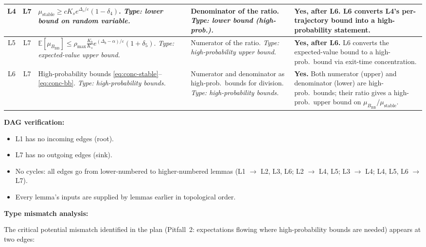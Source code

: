 \documentclass[11pt]{article}
\newcommand{\eps}{\varepsilon}
\newcommand{\Ds}{\Delta_s}
\newcommand{\Db}{\Delta_b}
\newcommand{\BBB}{B_{\mathrm{BB}}}
\begin{document}
\begin{center}
\begin{tabular}{|c|c|p{4.2cm}|p{4.2cm}|p{3.0cm}|}
L4 & L7 &
  $\mu_{\mathrm{stable}} \geq c K_s e^{\Ds/\eps}(1-\delta_4)$.
  \emph{Type: lower bound on random variable.} &
  Denominator of the ratio.
  \emph{Type: lower bound (high-prob.).} &
  \textbf{Yes, after L6.} L6 converts L4's per-trajectory bound into a high-probability statement. \\
\hline

L5 & L7 &
  $\mathbb{E}[\mu_{\BBB}] \leq \rho_{\max} \frac{K_b}{K_s} e^{(\Db-\alpha)/\eps}(1+\delta_5)$.
  \emph{Type: expected-value upper bound.} &
  Numerator of the ratio.
  \emph{Type: high-probability upper bound.} &
  \textbf{Yes, after L6.} L6 converts the expected-value bound to a high-prob.\ bound via exit-time concentration. \\
\hline

L6 & L7 &
  High-probability bounds \eqref{eq:conc-stable}--\eqref{eq:conc-bb}.
  \emph{Type: high-probability bounds.} &
  Numerator and denominator as high-prob.\ bounds for division.
  \emph{Type: high-probability bounds.} &
  \textbf{Yes.} Both numerator (upper) and denominator (lower) are high-prob.\ bounds; their ratio gives a high-prob.\ upper bound on $\mu_{\BBB} / \mu_{\mathrm{stable}}$. \\
\hline
\end{tabular}
\end{center}

\medskip
\noindent
\textbf{DAG verification:}
\begin{itemize}
\item L1 has no incoming edges (root).
\item L7 has no outgoing edges (sink).
\item No cycles: all edges go from lower-numbered to higher-numbered
  lemmas (L1 $\to$ L2, L3, L6; L2 $\to$ L4, L5; L3 $\to$ L4;
  L4, L5, L6 $\to$ L7).
\item Every lemma's inputs are supplied by lemmas earlier in
  topological order.
\end{itemize}

\medskip
\noindent
\textbf{Type mismatch analysis:}

The critical potential mismatch identified in the plan (Pitfall~2:
expectations flowing where high-probability bounds are needed)
appears at two edges:
\end{document}
